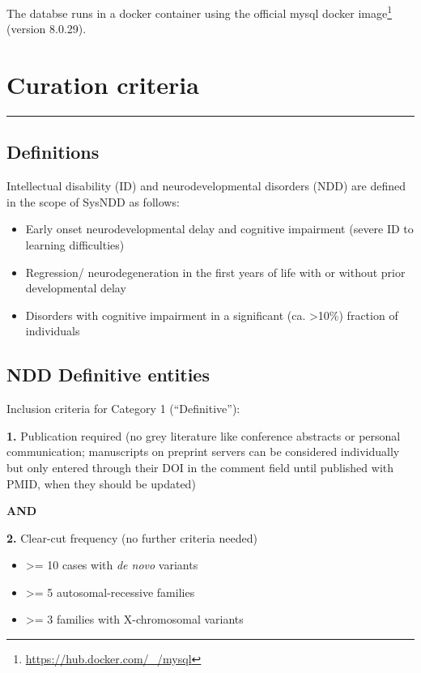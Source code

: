 \documentclass[
]{article}
\providecommand{\tightlist}{%
  \setlength{\itemsep}{0pt}\setlength{\parskip}{0pt}}
\renewcommand{\href}[2]{#2\footnote{\url{#1}}}
\begin{document}
The databse runs in a docker container using the \href{https://hub.docker.com/_/mysql}{official mysql docker image} (version 8.0.29).

\hypertarget{curation-criteria}{%
\section{Curation criteria}\label{curation-criteria}}

\begin{center}\rule{0.5\linewidth}{0.5pt}\end{center}

\hypertarget{definitions}{%
\subsection{Definitions}\label{definitions}}

Intellectual disability (ID) and neurodevelopmental disorders (NDD) are defined in the scope of SysNDD as follows:

\begin{itemize}
\tightlist
\item
  Early onset neurodevelopmental delay and cognitive impairment (severe ID to learning difficulties)
\item
  Regression/ neurodegeneration in the first years of life with or without prior developmental delay
\item
  Disorders with cognitive impairment in a significant (ca. \textgreater10\%) fraction of individuals
\end{itemize}

\hypertarget{ndd-definitive-entities}{%
\subsection{NDD Definitive entities}\label{ndd-definitive-entities}}

Inclusion criteria for Category 1 (``Definitive''):

\textbf{1.} Publication required (no grey literature like conference abstracts or personal communication; manuscripts on preprint servers can be considered individually but only entered through their DOI in the comment field until published with PMID, when they should be updated)

\textbf{AND}

\textbf{2.} Clear-cut frequency (no further criteria needed)

\begin{itemize}
\tightlist
\item
  \textgreater= 10 cases with \emph{de novo} variants
\item
  \textgreater= 5 autosomal-recessive families
\item
  \textgreater= 3 families with X-chromosomal variants
\end{itemize}
\end{document}

